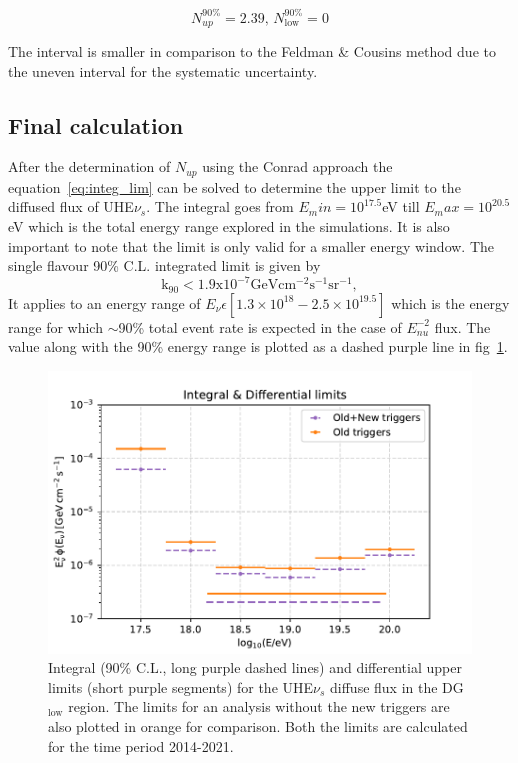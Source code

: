 \begin{equation}
  \label{eq:Conrad_lim}
  N^{90\%}_{up} = 2.39, \,N^{90\%}_{\text{low}} = 0
\end{equation}

The interval is smaller in comparison to the Feldman \& Cousins method due to the uneven interval for the systematic uncertainty. 

\subsection{Final calculation}
\label{subsec:final_lim}
After the determination of $N_{up}$ using the Conrad approach the equation~\ref{eq:integ_lim} can be solved to determine the upper limit to the diffused flux of UHE$\nu_s$. The integral goes from $E_min = 10^{17.5} $eV till $E_max = 10^{20.5} $eV which is the total energy range explored in the simulations. It is also important to note that the limit is only valid for a smaller energy window. The single flavour 90\% C.L. integrated limit is given by 
\begin{equation}
  \label{eq:final_lim} 
  \mathrm{k_{90} < 1.9 x 10^{-7} GeV cm^{-2} s^{-1} sr^{-1}},
\end{equation}
It applies to an energy range of $E_{\nu} \epsilon [1.3 \times 10^{18} - 2.5 \times 10^{19.5}]$ which is the energy range for which $\sim$90\% total event rate is expected in the case of $E^{-2}_{nu}$ flux. The value along with the 90\% energy range is plotted as a dashed purple line in fig~\ref{fig:Limit_comp_1}.

\begin{figure}[t!]
  \centering
  \includegraphics[width=14.5cm]{thesis_figures/ExpLimits/Integ_DiffLimit_comp_new_sim_optim.pdf}
  \caption{Integral (90\% C.L., long purple dashed lines) and differential upper limits (short purple segments) for the UHE$\nu_s$ diffuse flux in the DG$\mathrm{_{\text{low}}}$ region. The limits for an analysis without the new triggers are also plotted in orange for comparison. Both the limits are calculated for the time period 2014-2021.}
  \label{fig:Limit_comp_1}
\end{figure}

